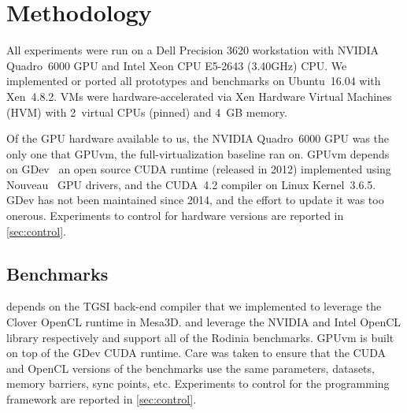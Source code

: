 \section{Methodology}
\label{sec_method}

All experiments were run on a Dell Precision 3620 workstation with NVIDIA
Quadro~6000 GPU and Intel Xeon CPU E5-2643 (3.40GHz) CPU. We implemented or ported all prototypes
and benchmarks on Ubuntu~16.04 with Xen~4.8.2. VMs were hardware-accelerated via Xen Hardware
Virtual Machines (HVM) with 2~virtual CPUs (pinned) and 4~GB memory.

Of the GPU hardware available to us, the NVIDIA Quadro~6000 GPU was the only one that GPUvm, the
full-virtual\-ization baseline ran on. GPUvm depends on GDev~\cite{gdev}
an open source CUDA runtime (released in 2012) implemented using Nouveau~\cite{nouveau} GPU
drivers, and the CUDA~4.2 compiler on Linux Kernel~3.6.5. GDev has not been maintained since 2014,
and the effort to update it was too onerous.
Experiments to control for hardware versions are reported in \ref{sec:control}.

\subsection{Benchmarks}
\trxc depends on the TGSI back-end compiler that we implemented to leverage
the Clover OpenCL runtime in Mesa3D.
\apigpu and \apicpu leverage the NVIDIA and Intel OpenCL library respectively
and support all of the Rodinia benchmarks.
GPUvm is built on top of the GDev CUDA runtime.
Care was taken to ensure that the CUDA and OpenCL versions of the benchmarks use the same
parameters, datasets, memory barriers, sync points, etc. Experiments to
control for the programming framework are reported in \ref{sec:control}.


